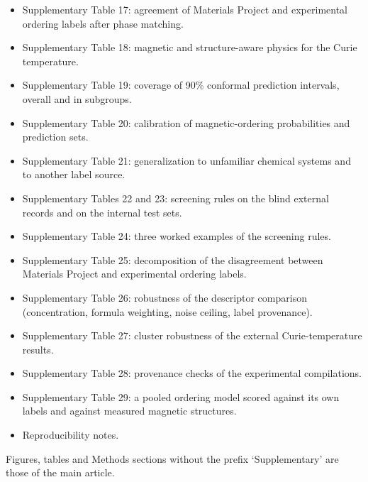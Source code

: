 \documentclass[pdflatex,sn-nature]{sn-jnl}
\begin{document}
\begin{itemize}
\item Supplementary Table 17: agreement of Materials Project and experimental ordering labels after phase matching.
\item Supplementary Table 18: magnetic and structure-aware physics for the Curie temperature.
\item Supplementary Table 19: coverage of 90\% conformal prediction intervals, overall and in subgroups.
\item Supplementary Table 20: calibration of magnetic-ordering probabilities and prediction sets.
\item Supplementary Table 21: generalization to unfamiliar chemical systems and to another label source.
\item Supplementary Tables 22 and 23: screening rules on the blind external records and on the internal test sets.
\item Supplementary Table 24: three worked examples of the screening rules.
\item Supplementary Table 25: decomposition of the disagreement between Materials Project and experimental ordering labels.
\item Supplementary Table 26: robustness of the descriptor comparison (concentration, formula weighting, noise ceiling, label provenance).
\item Supplementary Table 27: cluster robustness of the external Curie-temperature results.
\item Supplementary Table 28: provenance checks of the experimental compilations.
\item Supplementary Table 29: a pooled ordering model scored against its own labels and against measured magnetic structures.
\item Reproducibility notes.
\end{itemize}

Figures, tables and Methods sections without the prefix `Supplementary' are those of the main article.
\end{document}
